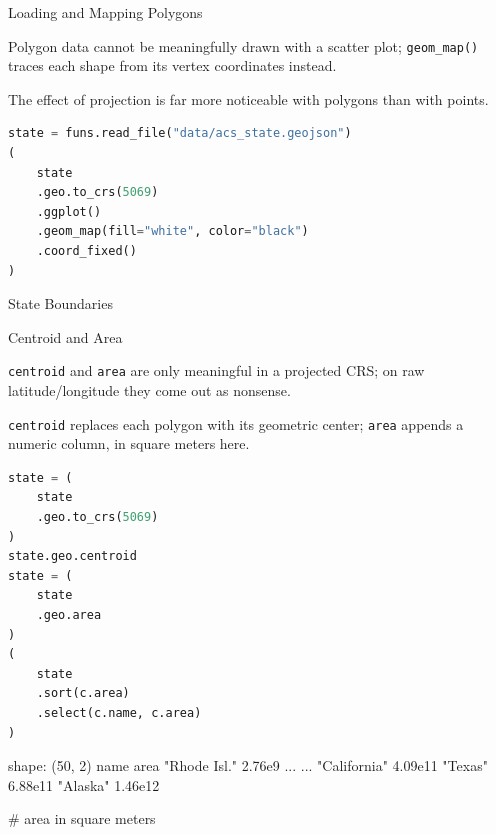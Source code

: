 \documentclass[8pt,aspectratio=169]{beamer}
\begin{document}
\begin{frame}[fragile]{Loading and Mapping Polygons}
\begin{splitcode}{%

Polygon data cannot be meaningfully drawn with a scatter plot; \texttt{geom\_map()} traces each shape from its vertex coordinates instead.

The effect of projection is far more noticeable with polygons than with points.

}
\begin{lstlisting}[language=Python]
state = funs.read_file("data/acs_state.geojson")
(
    state
    .geo.to_crs(5069)
    .ggplot()
    .geom_map(fill="white", color="black")
    .coord_fixed()
)
\end{lstlisting}
\end{splitcode}
\end{frame}

\begin{rightframe}{State Boundaries}
\end{rightframe}

\begin{frame}[fragile]{Centroid and Area}
\begin{splitcode}{%

\texttt{centroid} and \texttt{area} are only meaningful in a projected CRS; on raw latitude/longitude they come out as nonsense.

\texttt{centroid} replaces each polygon with its geometric center; \texttt{area} appends a numeric column, in square meters here.

}
\begin{lstlisting}[language=Python]
state = (
    state
    .geo.to_crs(5069)
)
state.geo.centroid
state = (
    state
    .geo.area
)
(
    state
    .sort(c.area)
    .select(c.name, c.area)
)
\end{lstlisting}
\begin{codeoutput}
shape: (50, 2)
name          area
"Rhode Isl."  2.76e9
...           ...
"California"  4.09e11
"Texas"       6.88e11
"Alaska"      1.46e12

# area in square meters
\end{codeoutput}
\end{splitcode}
\end{frame}
\end{document}
